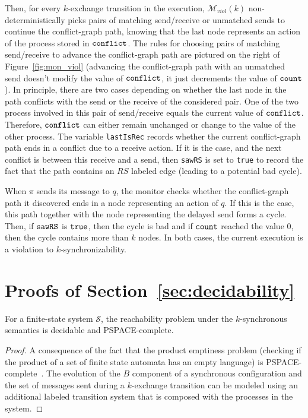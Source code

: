 Then, for every $k$-exchange transition in the execution, $\mathcal{M}_{\mathit{viol}}(k)$ non-deterministically picks pairs of matching send/receive or unmatched sends to continue the conflict-graph path, knowing that the last node represents an action of the process stored in ${\tt conflict}$. The rules for choosing pairs of matching send/receive to advance the conflict-graph path are pictured on the right of Figure~\ref{fig:mon_viol} (advancing the conflict-graph path with an unmatched send doesn't modify the value of ${\tt conflict}$, it just decrements the value of ${\tt count}$). In principle, there are two cases depending on whether the last node in the path conflicts with the send or the receive of the considered pair. One of the two process involved in this pair of send/receive equals the current value of ${\tt conflict}$. Therefore, ${\tt conflict}$ can either remain unchanged or change to the value of the other process. The variable {\tt lastIsRec} records whether the current conflict-graph path ends in a conflict due to a receive action. If it is the case, and the next conflict is between this receive and a send, then {\tt sawRS} is set to {\tt true} to record the fact that the path contains an $RS$ labeled edge (leading to a potential bad cycle).

When $\pi$ sends its message to $q$, the monitor checks whether the conflict-graph path it discovered ends in a node representing an action of $q$. If this is the case, this path together with the node representing the delayed send forms a cycle. Then, if ${\tt sawRS}$ is ${\tt true}$, then the cycle is bad and if ${\tt count}$ reached the value $0$, then the cycle contains more than $k$ nodes. In both cases, the current execution is a violation to $k$-synchronizability.

\section{Proofs of Section~\ref{sec:decidability}}\label{asec:decidability}

\begin{theorem}\label{th:dec1}
For a finite-state system $\mathcal{S}$, the reachability problem under the $k$-synchronous semantics is decidable and PSPACE-complete.
\end{theorem}
\begin{proof}
A consequence of the fact that the product emptiness problem (checking if the product of a set of finite state automata has an empty language) is PSPACE-complete~\cite{DBLP:conf/focs/Kozen77}. The evolution of the $B$ component of a synchronous configuration and the set of messages sent during a $k$-exchange transition can be modeled using an additional labeled transition system that is composed with the processes in the system. 
\end{proof}

